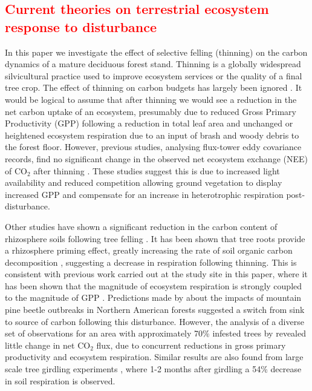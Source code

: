 \documentclass[draft,linenumbers]{agujournal}
\begin{document}
\subsection{\textcolor{red}{Current theories on terrestrial ecosystem response to disturbance}}
In this paper we investigate the effect of selective felling (thinning) on the carbon dynamics of a mature deciduous forest stand. Thinning is a globally widespread silvicultural practice used to improve ecosystem services or the quality of a final tree crop. The effect of thinning on carbon budgets has largely been ignored \citep{JGRG:JGRG779}. It would be logical to assume that after thinning we would see a reduction in the net carbon uptake of an ecosystem, presumably due to reduced Gross Primary Productivity (GPP) following a reduction in total leaf area and unchanged or heightened ecosystem respiration due to an input of brash and woody debris to the forest floor. However, previous studies, analysing flux-tower eddy covariance records, find no significant change in the observed net ecosystem exchange (NEE) of CO\(_{2}\) after thinning \citep{vesala2005effect, wilkinson2015effects, moreaux2011paired, dore2012recovery}. These studies suggest this is due to increased light availability and reduced competition allowing ground vegetation to display increased GPP and compensate for an increase in heterotrophic respiration post-disturbance.  

Other studies have shown a significant reduction in the carbon content of rhizosphere soils following tree felling \citep{Hernesmaa2005777}. It has been shown that tree roots provide a rhizosphere priming effect, greatly increasing the rate of soil organic carbon decomposition \citep{ELE:ELE1095}, suggesting a decrease in respiration following thinning. This is consistent with previous work carried out at the study site in this paper, where it has been shown that the magnitude of ecosystem respiration is strongly coupled to the magnitude of GPP \citep{heinemeyer2012exploring}. Predictions made by \citet{kurz2008mountain} about the impacts of mountain pine beetle outbreaks in Northern American forests suggested a switch from sink to source of carbon following this disturbance. However, the analysis of a diverse set of observations for an area with approximately 70\% infested trees by \citet{ELE:ELE12097} revealed little change in net CO\(_{2}\) flux, due to concurrent reductions in gross primary productivity and ecosystem respiration. Similar results are also found from large scale tree girdling experiments \citep{hogberg2001large},  where 1-2 months after girdling a 54\% decrease in soil respiration is observed.
\end{document}
